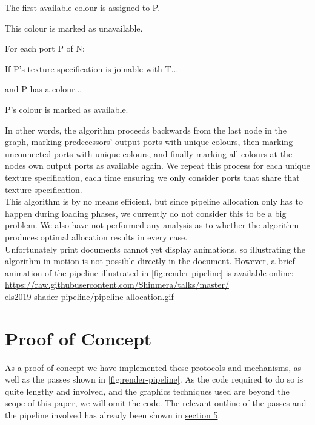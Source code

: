 \documentclass[format=sigconf]{acmart}
\begin{document}
\begin{step}
\begin{step}
\begin{step}
\begin{step}
      \item The first available colour is assigned to P.
      \item This colour is marked as unavailable.
      \end{step}
    \item For each port P of N:
      \begin{step}
      \item If P's texture specification is joinable with T...
      \item and P has a colour...
      \item P's colour is marked as available.
      \end{step}
    \end{step}
  \end{step}
\end{step}

In other words, the algorithm proceeds backwards from the last node in the graph, marking predecessors' output ports with unique colours, then marking unconnected ports with unique colours, and finally marking all colours at the nodes own output ports as available again. We repeat this process for each unique texture specification, each time ensuring we only consider ports that share that texture specification. \\

This algorithm is by no means efficient, but since pipeline allocation only has to happen during loading phases, we currently do not consider this to be a big problem. We also have not performed any analysis as to whether the algorithm produces optimal allocation results in every case.\\

Unfortunately print documents cannot yet display animations, so illustrating the algorithm in motion is not possible directly in the document. However, a brief animation of the pipeline illustrated in \autoref{fig:render-pipeline} is available online: \\

\href{https://raw.githubusercontent.com/Shinmera/talks/master/els2019-shader-pipeline/pipeline-allocation.gif}{https://raw.githubusercontent.com/Shinmera/talks/master/\\els2019-shader-pipeline/pipeline-allocation.gif}

\section{Proof of Concept}\label{concept}
As a proof of concept we have implemented these protocols and mechanisms, as well as the passes shown in \autoref{fig:render-pipeline}. As the code required to do so is quite lengthy and involved, and the graphics techniques used are beyond the scope of this paper, we will omit the code. The relevant outline of the passes and the pipeline involved has already been shown in \hyperref[pipelines]{section 5}. \\
\end{document}
